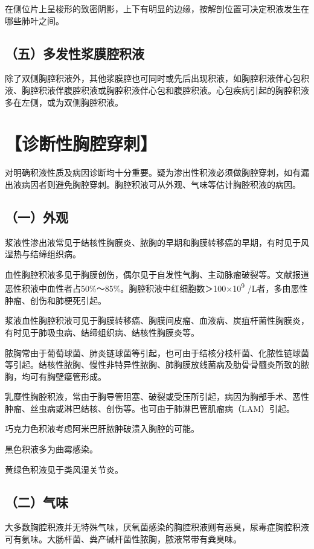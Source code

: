 在侧位片上呈梭形的致密阴影，上下有明显的边缘，按解剖位置可决定积液发生在哪些肺叶之间。

\subsection{（五）多发性浆膜腔积液}

除了双侧胸腔积液外，其他浆膜腔也可同时或先后出现积液，如胸腔积液伴心包积液、胸腔积液伴腹腔积液或胸腔积液伴心包和腹腔积液。心包疾病引起的胸腔积液多在左侧，或为双侧胸腔积液。

\section{【诊断性胸腔穿刺】}

对明确积液性质及病因诊断均十分重要。疑为渗出性积液必须做胸腔穿刺，如有漏出液病因者则避免胸腔穿刺。胸腔积液可从外观、气味等估计胸腔积液的病因。

\subsection{（一）外观}

浆液性渗出液常见于结核性胸膜炎、脓胸的早期和胸膜转移癌的早期，有时见于风湿热与结缔组织病。

血性胸腔积液多见于胸膜创伤，偶尔见于自发性气胸、主动脉瘤破裂等。文献报道恶性积液中血性者占50\%～85\%。胸腔积液中红细胞数＞100×10\textsuperscript{9}
/L者，多由恶性肿瘤、创伤和肺梗死引起。

浆液血性胸腔积液可见于胸膜转移癌、胸膜间皮瘤、血液病、炭疽杆菌性胸膜炎，有时见于肺吸虫病、结缔组织病、结核性胸膜炎等。

脓胸常由于葡萄球菌、肺炎链球菌等引起，也可由于结核分枝杆菌、化脓性链球菌等引起。结核性脓胸、慢性非特异性脓胸、肺胸膜放线菌病及肋骨骨髓炎所致的脓胸，均可有胸壁瘘管形成。

乳糜性胸腔积液，常由于胸导管阻塞、破裂或受压所引起，病因为胸部手术、恶性肿瘤、丝虫病或淋巴结核、创伤等。也可由于肺淋巴管肌瘤病（LAM）引起。

巧克力色积液考虑阿米巴肝脓肿破溃入胸腔的可能。

黑色积液多为曲霉感染。

黄绿色积液见于类风湿关节炎。

\subsection{（二）气味}

大多数胸腔积液并无特殊气味，厌氧菌感染的胸腔积液则有恶臭，尿毒症胸腔积液可有氨味。大肠杆菌、粪产碱杆菌性脓胸，脓液常带有粪臭味。

